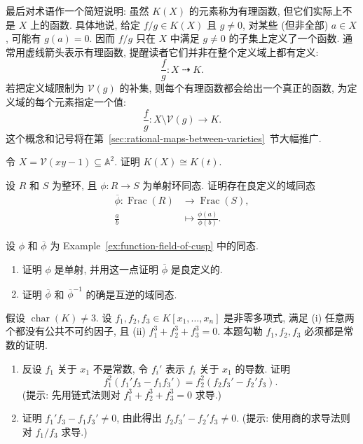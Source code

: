 最后对术语作一个简短说明: 虽然 $K(X)$ 的元素称为有理函数, 但它们实际上不是 $X$ 上的函数. 具体地说, 给定 $f/g\in K(X)$ 且 $g\neq0$, 对某些 (但非全部) $a\in X$, 可能有 $g(a)=0$. 因而 $f/g$ 只在 $X$ 中满足 $g\neq0$ 的子集上定义了一个函数. 通常用虚线箭头表示有理函数, 提醒读者它们并非在整个定义域上都有定义:
\[
  \frac{f}{g}:X\mathrel{\rightdasharrow}K.
\]
若把定义域限制为 $\mathcal{V}(g)$ 的补集, 则每个有理函数都会给出一个真正的函数, 为定义域的每个元素指定一个值:
\[
  \frac{f}{g}:X\setminus\mathcal{V}(g)\longrightarrow K.
\]
这个概念和记号将在第~\ref{sec:rational-maps-between-varieties}~节大幅推广.

\BookExerciseHeading
\begin{BookExercises}
  \item\label{ex:hyperbola-function-field} 令 $X=\mathcal{V}(xy-1)\subseteq\mathbb{A}^{2}$. 证明 $K(X)\cong K(t)$.
  \item\label{ex:extend-injection-to-fraction-fields} 设 $R$ 和 $S$ 为整环, 且 $\phi:R\to S$ 为单射环同态. 证明存在良定义的域同态
  \[
    \begin{aligned}
      \overline{\phi}:\operatorname{Frac}(R)&\to\operatorname{Frac}(S),\\
      \frac{a}{b}&\mapsto\frac{\phi(a)}{\phi(b)}.
    \end{aligned}
  \]
  \item\label{ex:verify-cusp-function-field-isomorphism} 设 $\phi$ 和 $\overline{\phi}$ 为 Example~\ref{ex:function-field-of-cusp} 中的同态.
  \begin{enumerate}
    \item 证明 $\phi$ 是单射, 并用这一点证明 $\overline{\phi}$ 是良定义的.
    \item 证明 $\overline{\phi}$ 和 $\overline{\phi}^{-1}$ 的确是互逆的域同态.
  \end{enumerate}
  \item\label{ex:polynomial-fermat-cubes} 假设 $\operatorname{char}(K)\neq3$. 设 $f_{1},f_{2},f_{3}\in K[x_{1},\ldots,x_{n}]$ 是非零多项式, 满足 (i) 任意两个都没有公共不可约因子, 且 (ii) $f_{1}^{3}+f_{2}^{3}+f_{3}^{3}=0$. 本题勾勒 $f_{1},f_{2},f_{3}$ 必须都是常数的证明.
  \begin{enumerate}
    \item 反设 $f_{1}$ 关于 $x_{1}$ 不是常数, 令 $f_{i}'$ 表示 $f_{i}$ 关于 $x_{1}$ 的导数. 证明
    \[
      f_{1}^{2}(f_{1}'f_{3}-f_{1}f_{3}')=f_{2}^{2}(f_{2}f_{3}'-f_{2}'f_{3}).
    \]
    (提示: 先用链式法则对 $f_{1}^{3}+f_{2}^{3}+f_{3}^{3}=0$ 求导.)
    \item 证明 $f_{1}'f_{3}-f_{1}f_{3}'\neq0$, 由此得出 $f_{2}f_{3}'-f_{2}'f_{3}\neq0$. (提示: 使用商的求导法则对 $f_{1}/f_{3}$ 求导.)

\end{enumerate}
\end{BookExercises}
